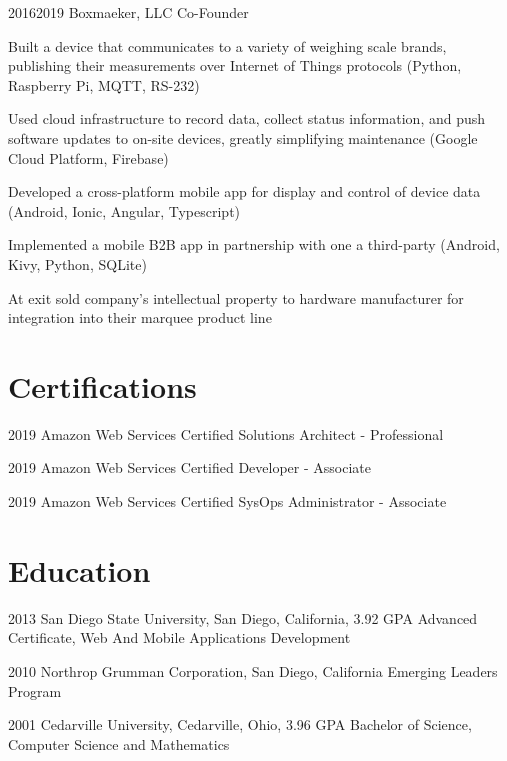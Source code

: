 \documentclass{article}
\begin{document}
\job
  {2016}{2019}
  {Boxmaeker, LLC}
  {Co-Founder}
  {\begin{achievements}
    \item Built a device that communicates to a variety of weighing scale brands, publishing their measurements over Internet of Things protocols (Python, Raspberry Pi, MQTT, RS-232)
    \item Used cloud infrastructure to record data, collect status information, and push software updates to on-site devices, greatly simplifying maintenance (Google Cloud Platform, Firebase)
    \item Developed a cross-platform mobile app for display and control of device data (Android, Ionic, Angular, Typescript)
    \item Implemented a mobile B2B app in partnership with one a third-party (Android, Kivy, Python, SQLite)
    \item At exit sold company's intellectual property to hardware manufacturer for integration into their marquee product line
  \end{achievements}}


\section{Certifications}

\education
  {2019}
  {Amazon Web Services}
  {Certified Solutions Architect - Professional}

\education
  {2019}
  {Amazon Web Services}
  {Certified Developer - Associate}


\education
  {2019}
  {Amazon Web Services}
  {Certified SysOps Administrator - Associate}


\section{Education}

\education
  {2013}
  {San Diego State University, San Diego, California, 3.92 GPA}
  {Advanced Certificate, Web And Mobile Applications Development}

\education
  {2010}
  {Northrop Grumman Corporation, San Diego, California}
  {Emerging Leaders Program}

\education
  {2001}
  {Cedarville University, Cedarville, Ohio, 3.96 GPA}
  {Bachelor of Science, Computer Science and Mathematics}


\section{}

\credits
\end{document}
